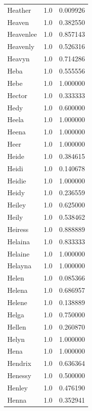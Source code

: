 \documentclass[
  letterpaper,
  DIV=11,
  numbers=noendperiod]{scrreprt}
\begin{document}
\begin{tabular}{lrr}
Heather         &   1.0 &   0.009926 \\
Heaven          &   1.0 &   0.382550 \\
Heavenlee       &   1.0 &   0.857143 \\
Heavenly        &   1.0 &   0.526316 \\
Heavyn          &   1.0 &   0.714286 \\
Heba            &   1.0 &   0.555556 \\
Hebe            &   1.0 &   1.000000 \\
Hector          &   1.0 &   0.333333 \\
Hedy            &   1.0 &   0.600000 \\
Heela           &   1.0 &   1.000000 \\
Heena           &   1.0 &   1.000000 \\
Heer            &   1.0 &   1.000000 \\
Heide           &   1.0 &   0.384615 \\
Heidi           &   1.0 &   0.140678 \\
Heidie          &   1.0 &   1.000000 \\
Heidy           &   1.0 &   0.236559 \\
Heiley          &   1.0 &   0.625000 \\
Heily           &   1.0 &   0.538462 \\
Heiress         &   1.0 &   0.888889 \\
Helaina         &   1.0 &   0.833333 \\
Helaine         &   1.0 &   1.000000 \\
Helayna         &   1.0 &   1.000000 \\
Helen           &   1.0 &   0.085366 \\
Helena          &   1.0 &   0.686957 \\
Helene          &   1.0 &   0.138889 \\
Helga           &   1.0 &   0.750000 \\
Hellen          &   1.0 &   0.260870 \\
Helyn           &   1.0 &   1.000000 \\
Hena            &   1.0 &   1.000000 \\
Hendrix         &   1.0 &   0.636364 \\
Henessy         &   1.0 &   0.500000 \\
Henley          &   1.0 &   0.476190 \\
Henna           &   1.0 &   0.352941 \\

\end{tabular}
\end{document}
